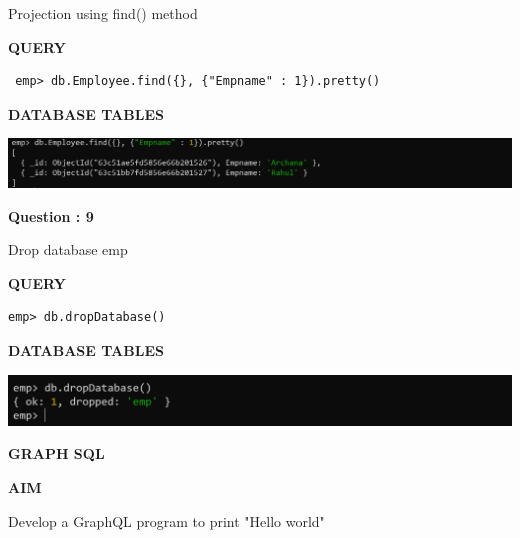 \documentclass[a4paper,12pt]{report}
\begin{document}
Projection using find() method
\begin{flushleft}
\textbf{QUERY }
\end{flushleft}
 \begin{verbatim}
 emp> db.Employee.find({}, {"Empname" : 1}).pretty()
\end{verbatim}
\begin{flushleft}
\textbf{DATABASE TABLES}
\end{flushleft}
\includegraphics[scale=0.386]{M9copy.png}
\begin{flushleft}
    \textbf{Question : 9}
\end{flushleft}
Drop database emp
\begin{flushleft}
\textbf{QUERY }
\end{flushleft}
 \begin{verbatim}
emp> db.dropDatabase()
\end{verbatim}
\begin{flushleft}
\textbf{DATABASE TABLES}
\end{flushleft}
\includegraphics[scale=0.53]{M10.png}
\newpage\newpage
\begin{center}
\large\textbf{GRAPH SQL}
\end{center}

\begin{flushleft}
\textbf{AIM }
\end{flushleft}
Develop a GraphQL program to print "Hello world"
\end{document}
